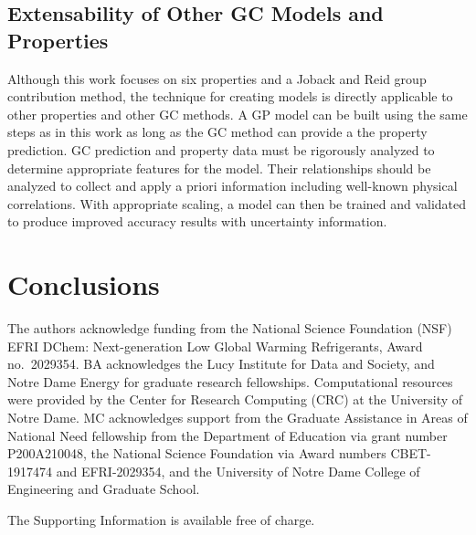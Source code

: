 \documentclass[journal=jacsat,manuscript=article]{achemso}
\begin{document}
\subsection{Extensability of Other GC Models and Properties}
Although this work focuses on six properties and a Joback and Reid group contribution method, the technique for creating models is directly applicable to other properties and other GC methods. A GP model can be built using the same steps as in this work as long as the GC method can provide a the property prediction. GC prediction and property data must be rigorously analyzed to determine appropriate features for the model. Their relationships should be analyzed to collect and apply a priori information including well-known physical correlations. With appropriate scaling, a model can then be trained and validated to produce improved accuracy results with uncertainty information.

\section{Conclusions}



\begin{acknowledgement}
The authors acknowledge funding from the National Science Foundation (NSF) EFRI DChem: Next-generation Low Global Warming Refrigerants, Award no.~2029354. BA acknowledges the Lucy Institute for Data and Society, and Notre Dame Energy for graduate research fellowships. Computational resources were provided by the Center for Research Computing (CRC) at the University of Notre Dame. MC acknowledges support from the Graduate Assistance in Areas of National Need fellowship from the Department of Education via grant number P200A210048, the National Science Foundation via Award numbers CBET-1917474 and EFRI-2029354, and the University of Notre Dame College of Engineering and Graduate School.  
\end{acknowledgement}

\begin{suppinfo}
The Supporting Information is available free of charge. 

\end{suppinfo}
\end{document}

